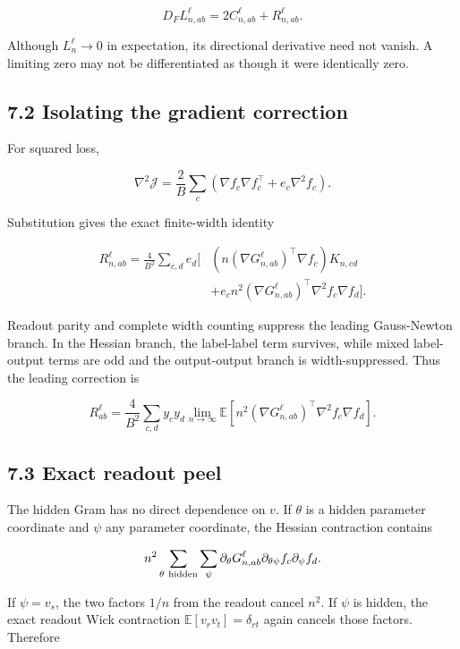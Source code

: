 \[
D_FL^\ell_{n,ab}
=
2C^\ell_{n,ab}+R^\ell_{n,ab}.
\]


Although \(L^\ell_n\to0\) in expectation, its directional derivative need
not vanish. A limiting zero may not be differentiated as though it were
identically zero.

\subsection*{7.2 Isolating the gradient correction}


For squared loss,

\[
\nabla^2\mathcal J
=
\frac2B\sum_c
\left(
\nabla f_c\nabla f_c^\top
+e_c\nabla^2f_c
\right).
\]


Substitution gives the exact finite-width identity

\[
\begin{aligned}
R^\ell_{n,ab}
=
\frac4{B^2}\sum_{c,d}e_d
\Big[&
\left(n(\nabla G^\ell_{n,ab})^{\top}\nabla f_c\right)K_{n,cd}
\\
&+
e_c n^2
(\nabla G^\ell_{n,ab})^{\top}
\nabla^2f_c\nabla f_d
\Big].
\end{aligned}
\]


Readout parity and complete width counting suppress the leading
Gauss-Newton branch. In the Hessian branch, the label-label term survives,
while mixed label-output terms are odd and the output-output branch is
width-suppressed. Thus the leading correction is

\[
\boxed{
R^\ell_{ab}
=
\frac4{B^2}\sum_{c,d}y_cy_d
\lim_{n\to\infty}
\mathbb E\left[
n^2(\nabla G^\ell_{n,ab})^{\top}
\nabla^2f_c\nabla f_d
\right].
}
\]


\subsection*{7.3 Exact readout peel}


The hidden Gram has no direct dependence on \(v\). If \(\theta\) is a hidden
parameter coordinate and \(\psi\) any parameter coordinate, the Hessian
contraction contains

\[
n^2\sum_{\theta\ {\rm hidden}}\sum_\psi
\partial_\theta G^\ell_{n,ab}
\partial_{\theta\psi}f_c
\partial_\psi f_d.
\]


If \(\psi=v_s\), the two factors \(1/n\) from the readout cancel \(n^2\).
If \(\psi\) is hidden, the exact readout Wick contraction
\(\mathbb E[v_rv_t]=\delta_{rt}\) again cancels those factors. Therefore

